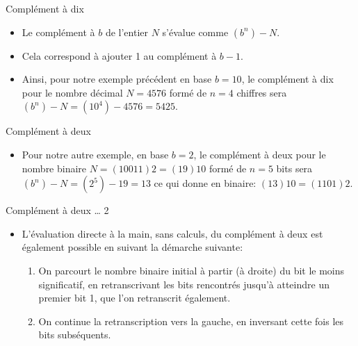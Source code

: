 \documentclass[presentation]{beamer}
\begin{document}
\begin{frame}[label={sec:org487ad22}]{Complément à dix}
\begin{itemize}
\item Le complément à \(b\) de l'entier \(N\) s'évalue comme \((b^n)-N\).

\item Cela correspond à ajouter 1 au complément à \(b-1\).

\item Ainsi, pour notre exemple précédent en base \(b=10\), le complément à dix pour le nombre décimal \(N = 4576\) formé de \(n=4\) chiffres sera \((b^n)-N = (10^4) - 4576 = 5425\).
\end{itemize}
\end{frame}

\begin{frame}[label={sec:orge91ab78}]{Complément à deux}
\begin{itemize}
\item Pour notre autre exemple, en base \(b=2\), le complément à deux pour le nombre binaire \(N = (10011)2 = (19)10\) formé de \(n=5\) bits sera \((b^n)-N = (2^5) - 19 = 13\) ce qui donne en binaire: \((13)10 = (1101)2\).
\end{itemize}
\end{frame}

\begin{frame}[label={sec:org948c589}]{Complément à deux \ldots{} 2}
\begin{itemize}
\item L'évaluation directe à la main, sans calculs, du complément à deux est également possible en suivant la démarche suivante:
\begin{enumerate}
\item On parcourt le nombre binaire initial à partir (à droite) du bit le moins significatif, en retranscrivant les bits rencontrés jusqu'à atteindre un premier bit 1, que l'on retranscrit également.
\item On continue la retranscription vers la gauche, en inversant cette fois les bits subséquents.
\end{enumerate}
\end{itemize}
\end{frame}
\end{document}
